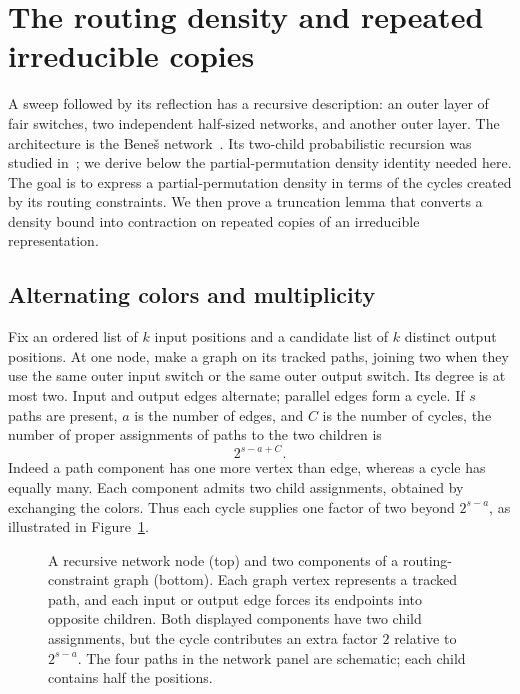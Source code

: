 \section{The routing density and repeated irreducible copies}\label{sec:network}
A sweep followed by its reflection has a recursive description: an outer layer of fair switches, two independent half-sized networks, and another outer layer. The architecture is the Bene\v{s} network~\cite{Benes1964}. Its two-child probabilistic recursion was studied in~\cite[Section 4, Proposition 1]{GelmanTaShma2014}; we derive below the partial-permutation density identity needed here. The goal is to express a partial-permutation density in terms of the cycles created by its routing constraints. We then prove a truncation lemma that converts a density bound into contraction on repeated copies of an irreducible representation.

\subsection{Alternating colors and multiplicity}
Fix an ordered list of $k$ input positions and a candidate list of $k$ distinct output positions. At one node, make a graph on its tracked paths, joining two when they use the same outer input switch or the same outer output switch. Its degree is at most two. Input and output edges alternate; parallel edges form a cycle. If $s$ paths are present, $a$ is the number of edges, and $C$ is the number of cycles, the number of proper assignments of paths to the two children is
\[
 2^{s-a+C}.
\]
Indeed a path component has one more vertex than edge, whereas a cycle
has equally many. Each component admits two child assignments, obtained
by exchanging the colors. Thus each cycle supplies one factor of two
beyond $2^{s-a}$, as illustrated in Figure~\ref{fig:network-node}.

\begin{figure}[ht]
\centering

\caption{A recursive network node (top) and two components of a routing-constraint graph (bottom). Each graph vertex represents a tracked path, and each input or output edge forces its endpoints into opposite children. Both displayed components have two child assignments, but the cycle contributes an extra factor $2$ relative to $2^{s-a}$. The four paths in the network panel are schematic; each child contains half the positions.}
\label{fig:network-node}
\end{figure}

